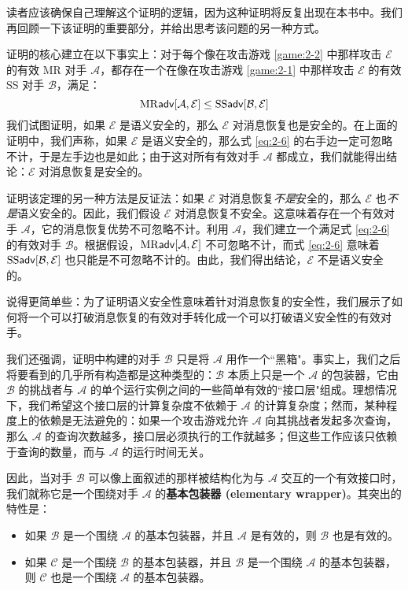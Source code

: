 \vspace{5pt}

读者应该确保自己理解这个证明的逻辑，因为这种证明将反复出现在本书中。我们再回顾一下该证明的重要部分，并给出思考该问题的另一种方式。

证明的核心建立在以下事实上：对于每个像在攻击游戏 \ref{game:2-2} 中那样攻击 $\mathcal{E}$ 的有效 MR 对手 $\mathcal{A}$，都存在一个在像在攻击游戏 \ref{game:2-1} 中那样攻击 $\mathcal{E}$ 的有效 SS 对手 $\mathcal{B}$，满足：
\begin{equation}\label{eq:2-6}
{\rm MR\mathsf{adv}}[\mathcal{A},\mathcal{E}]\leq{\rm SS\mathsf{adv}}[\mathcal{B},\mathcal{E}]
\end{equation}
我们试图证明，如果 $\mathcal{E}$ 是语义安全的，那么 $\mathcal{E}$ 对消息恢复也是安全的。在上面的证明中，我们声称，如果 $\mathcal{E}$ 是语义安全的，那么式 \ref{eq:2-6} 的右手边一定可忽略不计，于是左手边也是如此；由于这对所有有效对手 $\mathcal{A}$ 都成立，我们就能得出结论：$\mathcal{E}$ 对消息恢复是安全的。

证明该定理的另一种方法是反证法：如果 $\mathcal{E}$ 对消息恢复\emph{不是}安全的，那么 $\mathcal{E}$ 也\emph{不是}语义安全的。因此，我们假设 $\mathcal{E}$ 对消息恢复不安全。这意味着存在一个有效对手 $\mathcal{A}$，它的消息恢复优势不可忽略不计。利用 $\mathcal{A}$，我们建立一个满足式 \ref{eq:2-6} 的有效对手 $\mathcal{B}$。根据假设，${\rm MR\mathsf{adv}}[\mathcal{A},\mathcal{E}]$ 不可忽略不计，而式 \ref{eq:2-6} 意味着 ${\rm SS\mathsf{adv}}[\mathcal{B},\mathcal{E}]$ 也只能是不可忽略不计的。由此，我们得出结论，$\mathcal{E}$ 不是语义安全的。

说得更简单些：为了证明语义安全性意味着针对消息恢复的安全性，我们展示了如何将一个可以打破消息恢复的有效对手转化成一个可以打破语义安全性的有效对手。

我们还强调，证明中构建的对手 $\mathcal{B}$ 只是将 $\mathcal{A}$ 用作一个``黑箱"。事实上，我们之后将要看到的几乎所有构造都是这种类型的：$\mathcal{B}$ 本质上只是一个 $\mathcal{A}$ 的包装器，它由 $\mathcal{B}$ 的挑战者与 $\mathcal{A}$ 的单个运行实例之间的一些简单有效的``接口层"组成。理想情况下，我们希望这个接口层的计算复杂度不依赖于 $\mathcal{A}$ 的计算复杂度；然而，某种程度上的依赖是无法避免的：如果一个攻击游戏允许 $\mathcal{A}$ 向其挑战者发起多次查询，那么 $\mathcal{A}$ 的查询次数越多，接口层必须执行的工作就越多；但这些工作应该只依赖于查询的数量，而与 $\mathcal{A}$ 的运行时间无关。

因此，当对手 $\mathcal{B}$ 可以像上面叙述的那样被结构化为与 $\mathcal{A}$ 交互的一个有效接口时，我们就称它是一个围绕对手 $\mathcal{A}$ 的\textbf{基本包装器 (elementary wrapper)}。其突出的特性是：
\begin{itemize}
	\item 如果 $\mathcal{B}$ 是一个围绕 $\mathcal{A}$ 的基本包装器，并且 $\mathcal{A}$ 是有效的，则 $\mathcal{B}$ 也是有效的。
	\item 如果 $\mathcal{C}$ 是一个围绕 $\mathcal{B}$ 的基本包装器，并且 $\mathcal{B}$ 是一个围绕 $\mathcal{A}$ 的基本包装器，则 $\mathcal{C}$ 也是一个围绕 $\mathcal{A}$ 的基本包装器。
\end{itemize}

